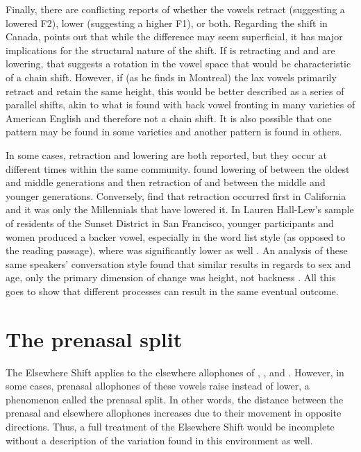 Finally, there are conflicting reports of whether the vowels retract (suggesting a lowered F2), lower (suggesting a higher F1), or both. Regarding the shift in Canada, \citet{boberg_2005} points out that while the difference may seem superficial, it has major implications for the structural nature of the shift. If \trap is retracting and \dress and \kit are lowering, that suggests a rotation in the vowel space that would be characteristic of a chain shift. However, if (as he finds in Montreal) the lax vowels primarily retract and retain the same height, this would be better described as a series of parallel shifts, akin to what is found with back vowel fronting in many varieties of American English and therefore not a chain shift. It is also possible that one pattern may be found in some varieties and another pattern is found in others.

In some cases, retraction and lowering are both reported, but they occur at different times within the same community. \citet[144]{boberg_2005} found lowering of \trap between the oldest and middle generations and then retraction of \trap and \dress between the middle and younger generations. Conversely, \citet{donofrio_etal_2019} find that \trap retraction occurred first in California and it was only the Millennials that have lowered it. In Lauren Hall-Lew's sample of residents of the Sunset District in San Francisco, younger participants and women produced a backer vowel, especially in the word list style (as opposed to the reading passage), where \bat was significantly lower as well \citep{hall_lew_etal_2015}. An analysis of these same speakers' conversation style found that similar results in regards to sex and age, only the primary dimension of change was height, not backness \citep{cardoso_etal_2016_pads}. All this goes to show that different processes can result in the same eventual outcome.







\section{The prenasal split}
\label{sec:prenasal_split}

The Elsewhere Shift applies to the elsewhere allophones of \trap, \dress, and \kit. However, in some cases, prenasal allophones of these vowels raise instead of lower, a phenomenon called the prenasal split. In other words, the distance between the prenasal and elsewhere allophones increases due to their movement in opposite directions. Thus, a full treatment of the Elsewhere Shift would be incomplete without a description of the variation found in this environment as well.

